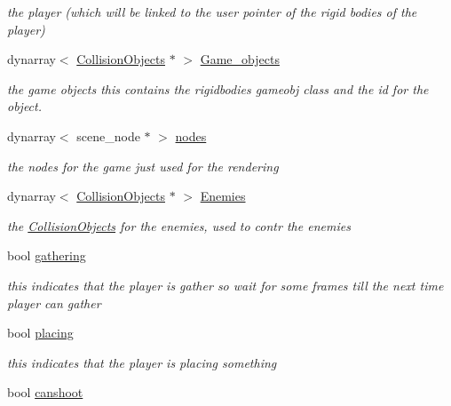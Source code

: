 \begin{DoxyCompactItemize}
\begin{DoxyCompactList}\small\item\em the player (which will be linked to the user pointer of the rigid bodies of the player) \end{DoxyCompactList}\item 
dynarray$<$ \hyperlink{classoctet_1_1_collision_objects}{Collision\+Objects} $\ast$ $>$ \hyperlink{classoctet_1_1minecraft__wars_ace75749e2bc41e51eafd0e44b0670b8b}{Game\+\_\+objects}
\begin{DoxyCompactList}\small\item\em the game objects this contains the rigidbodies gameobj class and the id for the object. \end{DoxyCompactList}\item 
dynarray$<$ scene\+\_\+node $\ast$ $>$ \hyperlink{classoctet_1_1minecraft__wars_a2ef2f751e20910c5fd0bdeca72a9a592}{nodes}
\begin{DoxyCompactList}\small\item\em the nodes for the game just used for the rendering \end{DoxyCompactList}\item 
dynarray$<$ \hyperlink{classoctet_1_1_collision_objects}{Collision\+Objects} $\ast$ $>$ \hyperlink{classoctet_1_1minecraft__wars_af16a3ace67e10fe889a385b8ab8405cb}{Enemies}
\begin{DoxyCompactList}\small\item\em the \hyperlink{classoctet_1_1_collision_objects}{Collision\+Objects} for the enemies, used to contr the enemies \end{DoxyCompactList}\item 
bool \hyperlink{classoctet_1_1minecraft__wars_ae02d056bcc40e7b09635ab2856d8d5d7}{gathering}
\begin{DoxyCompactList}\small\item\em this indicates that the player is gather so wait for some frames till the next time player can gather \end{DoxyCompactList}\item 
bool \hyperlink{classoctet_1_1minecraft__wars_ad801da09f504cde20563c2fe46e196e1}{placing}
\begin{DoxyCompactList}\small\item\em this indicates that the player is placing something \end{DoxyCompactList}\item 
bool \hyperlink{classoctet_1_1minecraft__wars_a33d14857ff44463f24ca76747c762745}{canshoot}

\end{DoxyCompactItemize}
